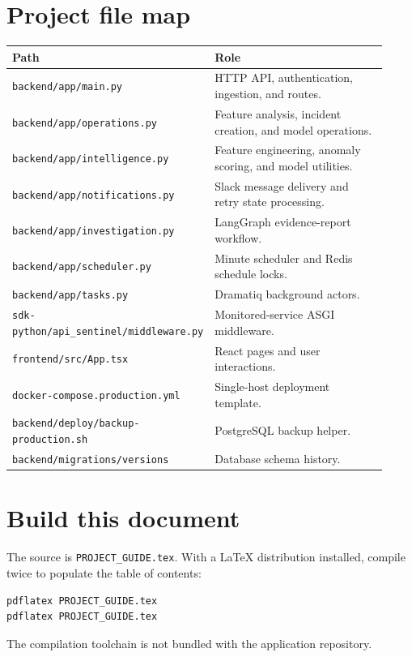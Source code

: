 \documentclass[11pt,a4paper]{article}
\begin{document}
\section{Project file map}
\begin{longtable}{p{0.42\linewidth}p{0.5\linewidth}}
\toprule
\textbf{Path} & \textbf{Role} \\
\midrule
\texttt{backend/app/main.py} & HTTP API, authentication, ingestion, and routes. \\
\texttt{backend/app/operations.py} & Feature analysis, incident creation, and model operations. \\
\texttt{backend/app/intelligence.py} & Feature engineering, anomaly scoring, and model utilities. \\
\texttt{backend/app/notifications.py} & Slack message delivery and retry state processing. \\
\texttt{backend/app/investigation.py} & LangGraph evidence-report workflow. \\
\texttt{backend/app/scheduler.py} & Minute scheduler and Redis schedule locks. \\
\texttt{backend/app/tasks.py} & Dramatiq background actors. \\
\texttt{sdk-python/api\_sentinel/middleware.py} & Monitored-service ASGI middleware. \\
\texttt{frontend/src/App.tsx} & React pages and user interactions. \\
\texttt{docker-compose.production.yml} & Single-host deployment template. \\
\texttt{backend/deploy/backup-production.sh} & PostgreSQL backup helper. \\
\texttt{backend/migrations/versions} & Database schema history. \\
\bottomrule
\end{longtable}

\section{Build this document}
The source is \texttt{PROJECT\_GUIDE.tex}. With a LaTeX distribution installed,
compile twice to populate the table of contents:

\begin{lstlisting}[language=bash]
pdflatex PROJECT_GUIDE.tex
pdflatex PROJECT_GUIDE.tex
\end{lstlisting}

The compilation toolchain is not bundled with the application repository.
\end{document}
